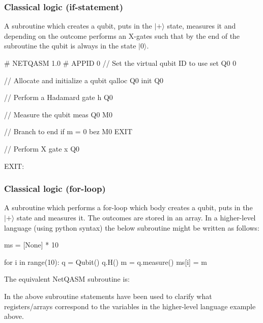 \subsubsection{Classical logic (if-statement)}
\label{netqasm:sec:example_nq_if}
A subroutine which creates a qubit, puts in the $|+\rangle$ state, measures it and depending on the outcome performs an X-gates such that by the end of the subroutine the qubit is always in the state $|0\rangle$.
\begin{nqcode}
# NETQASM 1.0
# APPID 0
// Set the virtual qubit ID to use
set Q0 0

// Allocate and initialize a qubit
qalloc Q0
init Q0

// Perform a Hadamard gate
h Q0

// Measure the qubit
meas Q0 M0

// Branch to end if m = 0
bez M0 EXIT

// Perform X gate
x Q0

EXIT:\end{nqcode}

\subsubsection{Classical logic (for-loop)}
\label{netqasm:sec:example_nq_for}
A subroutine which performs a for-loop which body creates a qubit, puts in the $|+\rangle$ state and measures it. The outcomes are stored in an array.
In a higher-level language (using python syntax) the below subroutine might be written as follows:
\begin{pycode}
ms = [None] * 10

for i in range(10):
  q = Qubit()
  q.H()
  m = q.measure()
  ms[i] = m
\end{pycode}
The equivalent \ac{NetQASM} subroutine is:

In the above subroutine  statements have been used to clarify what registers/arrays correspond to the variables in the higher-level language example above.


